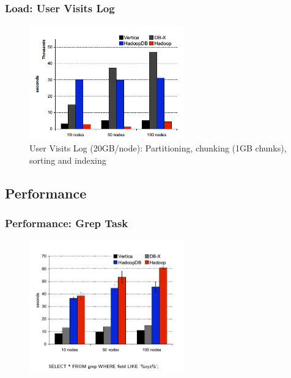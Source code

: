 \documentclass{beamer}
\begin{document}
\begin{frame}
  \frametitle{Load: User Visits Log}
  \begin{figure}
    \centering
    \begin{center}
      \includegraphics[width=0.6\textwidth]{Load-UserVisitLogs}
    \end{center}
    \caption{User Visits Log (20GB/node): Partitioning, chunking (1GB chunks), sorting and indexing}
    \label{fig:load-user-visit-log}
  \end{figure}
\end{frame}


\subsection{Performance}

\begin{frame}
  \frametitle{Performance: Grep Task}
  \begin{figure}
    \centering
    \begin{center}
      \includegraphics[width=0.6\textwidth]{Performance-Grep-Task}
    \end{center}
 \end{figure}
\end{frame}
\end{document}
